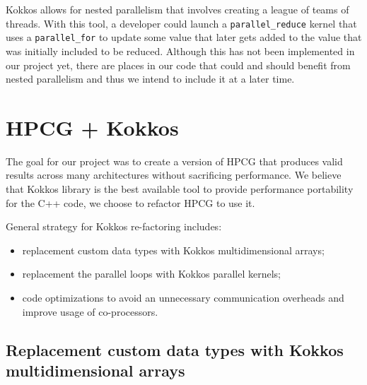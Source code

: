\documentclass{ccr15}
\begin{document}
Kokkos allows for nested parallelism that involves creating a league of teams of threads.
With this tool, a developer could launch a \texttt{parallel\_reduce} kernel that uses a \texttt{parallel\_for} to
update some value that later gets added to the value that was initially included to be reduced.
Although this has not been implemented in our project yet, there are places in our code that
could and should benefit from nested parallelism and thus we intend to include it at a later
time.

\section{HPCG + Kokkos}

The goal for our project was to create a version of HPCG that 
produces valid results across many architectures without sacrificing performance.
We believe that Kokkos library is the best available tool to provide performance portability for the C++ code, we choose to refactor HPCG to use it.

General strategy for Kokkos re-factoring includes: 
\begin{itemize}
\item replacement custom data types with Kokkos multidimensional arrays; 
\item replacement the parallel loops with Kokkos parallel kernels; 
\item code optimizations to avoid an unnecessary communication overheads and improve usage of co-processors.
\end{itemize}




\subsection{Replacement custom data types with Kokkos multidimensional arrays}
\end{document}
